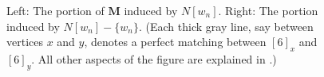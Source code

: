 \documentclass[11pt]{article}
\theoremstyle{definition}
\newcommand\MM{\textbf{M}}
\begin{document}
\begin{figure}[!b]
\caption{Left: The portion of $\MM$ induced by $N[w_n]$. Right: The portion induced by $N[w_n]-\{w_n\}$. (Each thick gray line, say between vertices $x$ and $y$, denotes a perfect matching between $[6]_x$ and 
$[6]_y$. All other aspects of the figure are explained in .)%
\label{example1-fig}}
\end{figure}
\end{document}
